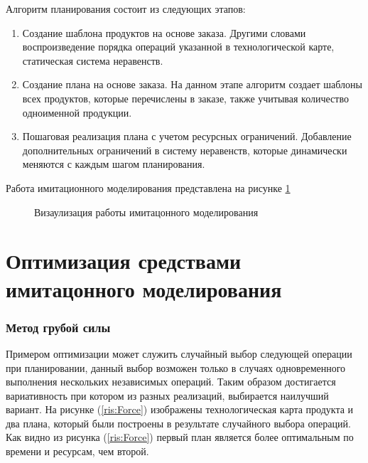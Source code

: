 Алгоритм планирования состоит из следующих этапов:
\begin{enumerate}
    \item Создание шаблона продуктов на основе заказа. Другими словами воспроизведение порядка операций указанной в технологической карте, статическая система неравенств.
    \item Создание плана на основе заказа. На данном этапе алгоритм создает шаблоны всех продуктов, которые перечислены в заказе, также учитывая количество одноименной продукции.
    \item Пошаговая реализация плана с учетом ресурсных ограничений. Добавление дополнительных ограничений в систему неравенств, которые динамически меняются с каждым шагом планирования.
\end{enumerate}
Работа имитационного моделирования представлена на рисунке \ref{ris:alg}
\begin{figure}[H]
    \caption{Визаулизация работы имитацонного моделирования}
    \label{ris:alg}
\end{figure}

\section{Оптимизация средствами имитацонного моделирования}

\subsubsection{Метод грубой силы}
Примером оптимизации может служить случайный выбор следующей операции при планировании, данный выбор возможен только в случаях одновременного выполнения нескольких независимых операций. Таким образом достигается вариативность при котором из разных реализаций, выбирается наилучший вариант. На рисунке (\ref{ris:Force}) изображены технологическая карта продукта и два плана, который были построены в результате случайного выбора операций. Как видно из рисунка (\ref{ris:Force}) первый план является более оптимальным по времени и ресурсам, чем второй.

